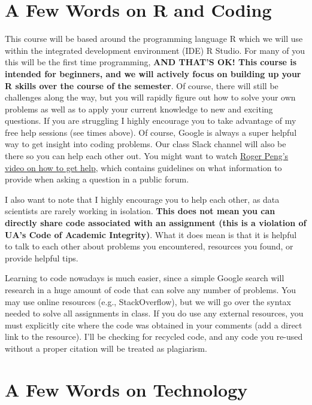 \documentclass[
]{book}
\begin{document}
\hypertarget{a-few-words-on-r-and-coding}{%
\section{A Few Words on R and Coding}\label{a-few-words-on-r-and-coding}}

This course will be based around the programming language R which we will use within the integrated development environment (IDE) R Studio. For many of you this will be the first time programming, \textbf{AND THAT'S OK! This course is intended for beginners, and we will actively focus on building up your R skills over the course of the semester}. Of course, there will still be challenges along the way, but you will rapidly figure out how to solve your own problems as well as to apply your current knowledge to new and exciting questions. If you are struggling I highly encourage you to take advantage of my free help sessions (see times above). Of course, Google is always a super helpful way to get insight into coding problems. Our class Slack channel will also be there so you can help each other out. You might want to watch \href{https://www.youtube.com/watch?v=ZFaWxxzouCY}{Roger Peng's video on how to get help}, which contains guidelines on what information to provide when asking a question in a public forum.

I also want to note that I highly encourage you to help each other, as data scientists are rarely working in isolation. \textbf{This does not mean you can directly share code associated with an assignment (this is a violation of UA's Code of Academic Integrity)}. What it does mean is that it is helpful to talk to each other about problems you encountered, resources you found, or provide helpful tips.

Learning to code nowadays is much easier, since a simple Google search will research in a huge amount of code that can solve any number of problems. You may use online resources (e.g., StackOverflow), but we will go over the syntax needed to solve all assignments in class. If you do use any external resources, you must explicitly cite where the code was obtained in your comments (add a direct link to the resource). I'll be checking for recycled code, and any code you re-used without a proper citation will be treated as plagiarism.

\hypertarget{a-few-words-on-technology}{%
\section{A Few Words on Technology}\label{a-few-words-on-technology}}
\end{document}
